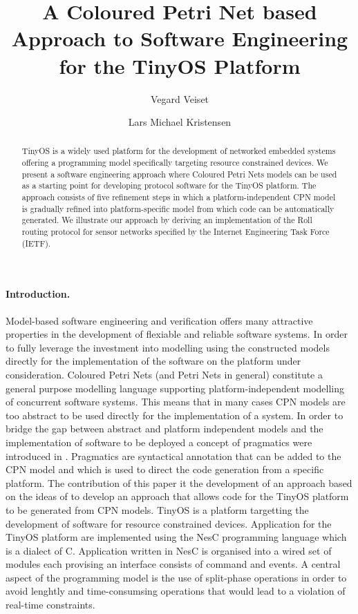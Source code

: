 \documentclass{llncs}
\title{
  A Coloured Petri Net based Approach to Software Engineering for the
  TinyOS Platform
}
\author{
  Vegard Veiset \and Lars Michael Kristensen
}
\institute{
  Department of Computing, Bergen University College \\
  Email: \email{vegard.veiset@stud.hib.no,lmkr@hib.no}
}
\begin{document}
\maketitle

\begin{abstract}

TinyOS is a widely used platform for the development of networked
embedded systems offering a programming model specifically targeting
resource constrained devices. We present a software engineering
approach where Coloured Petri Nets models can be used as a starting
point for developing protocol software for the TinyOS platform. The
approach consists of five refinement steps in which a
platform-independent CPN model is gradually refined into
platform-specific model from which code can be automatically
generated. We illustrate our approach by deriving an implementation of
the Roll routing protocol for sensor networks specified by the
Internet Engineering Task Force (IETF).

\end{abstract}

\paragraph{\textbf{Introduction.}}

Model-based software engineering and verification offers many
attractive properties in the development of flexiable and reliable
software systems. In order to fully leverage the investment into
modelling using the constructed models directly for the implementation
of the software on the platform under consideration. Coloured Petri
Nets (and Petri Nets in general) constitute a general purpose
modelling language supporting platform-independent modelling of
concurrent software systems. This means that in many cases CPN models
are too abstract to be used directly for the implementation of a
system. In order to bridge the gap between abstract and platform
independent models and the implementation of software to be deployed a
concept of pragmatics were introduced in \cite{X}. Pragmatics are
syntactical annotation that can be added to the CPN model and which is
used to direct the code generation from a specific platform. The
contribution of this paper it the development of an approach based on
the ideas of \cite{X} to develop an approach that allows code for the
TinyOS platform to be generated from CPN models. TinyOS is a platform
targetting the development of software for resource constrained
devices. Application for the TinyOS platform are implemented using the
NesC programming language which is a dialect of C. Application written
in NesC is organised into a wired set of modules each provising an
interface consists of command and events. A central aspect of the
programming model is the use of split-phase operations in order to
avoid lenghtly and time-consumsing operations that would lead to a
violation of real-time constraints.
\end{document}
